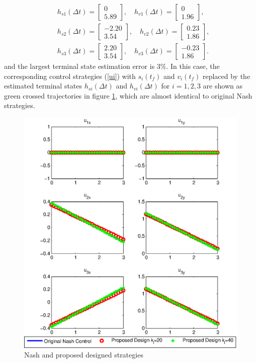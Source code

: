 \documentclass[10pt,doublecolumn]{IEEEtran}  %
\begin{document}
\begin{align*}
&h_{s1}(\Delta t)=\begin{bmatrix}
 0\\
    5.89
\end{bmatrix},\quad h_{v1}(\Delta t)=\begin{bmatrix}
   0\\
    1.96
\end{bmatrix},\\
&h_{s2}(\Delta t)=\begin{bmatrix}
 -2.20\\    3.54
\end{bmatrix},\quad h_{v2}(\Delta t)=\begin{bmatrix}
 0.23\\
    1.86
\end{bmatrix},\\
&h_{s3}(\Delta t)=\begin{bmatrix}
 2.20\\3.54
\end{bmatrix},\quad h_{v3}(\Delta t)=\begin{bmatrix}
-0.23\\    1.86
\end{bmatrix}.
\end{align*}
and the largest terminal state estimation error is $3\%$. In this case, the corresponding control strategies (\ref{ui}) with $s_i(t_f)$ and $v_i(t_f)$ replaced by the estimated terminal states $h_{si}(\Delta t)$ and $h_{vi}(\Delta t)$ for $i=1,2,3$ are shown as green crossed trajectories in figure \ref{Original_Distributed_control}, which are almost identical to original Nash strategies.
\begin{figure}[h]
      \centering
      \includegraphics[scale=0.58]{Original_Distributed_control.eps}
      \caption{Nash and proposed designed strategies}\label{Original_Distributed_control}
\end{figure}
\end{document}
